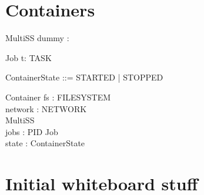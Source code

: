 \documentclass[a4paper,twoside,12pt]{article}
\begin{document}
\section{Containers}

\begin{schema}{MultiSS}
dummy : \nat
\end{schema}

\begin{zed}
\end{zed}

\begin{schema}{Job}
t: TASK\\
\end{schema}

\begin{zed}
ContainerState ::= STARTED | STOPPED
\end{zed}


\begin{schema}{Container}
fs : FILESYSTEM \\
network : NETWORK \\
MultiSS\\
jobs : PID \pfun Job \\
state : ContainerState \\

\end{schema}

\section{Initial whiteboard stuff}
\end{document}
